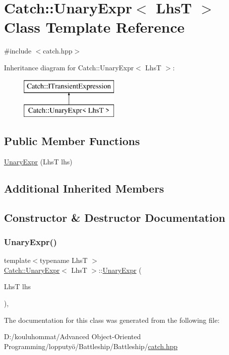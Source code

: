 \hypertarget{class_catch_1_1_unary_expr}{}\section{Catch\+:\+:Unary\+Expr$<$ LhsT $>$ Class Template Reference}
\label{class_catch_1_1_unary_expr}


{\ttfamily \#include $<$catch.\+hpp$>$}

Inheritance diagram for Catch\+:\+:Unary\+Expr$<$ LhsT $>$\+:\begin{figure}[H]
\begin{center}
\leavevmode
\includegraphics[height=2.000000cm]{class_catch_1_1_unary_expr}
\end{center}
\end{figure}
\subsection*{Public Member Functions}
\begin{DoxyCompactItemize}
\item 
\mbox{\hyperlink{class_catch_1_1_unary_expr_ae02f666a1e64da728628aa2033e1d6e7}{Unary\+Expr}} (LhsT lhs)
\end{DoxyCompactItemize}
\subsection*{Additional Inherited Members}


\subsection{Constructor \& Destructor Documentation}
\mbox{\label{class_catch_1_1_unary_expr_ae02f666a1e64da728628aa2033e1d6e7}} 
\subsubsection{\texorpdfstring{Unary\+Expr()}{UnaryExpr()}}
{\footnotesize\ttfamily template$<$typename LhsT $>$ \\
\mbox{\hyperlink{class_catch_1_1_unary_expr}{Catch\+::\+Unary\+Expr}}$<$ LhsT $>$\+::\mbox{\hyperlink{class_catch_1_1_unary_expr}{Unary\+Expr}} (\begin{DoxyParamCaption}\item[{LhsT}]{lhs }\end{DoxyParamCaption})\hspace{0.3cm}{\ttfamily [inline]}, {\ttfamily [explicit]}}



The documentation for this class was generated from the following file\+:\begin{DoxyCompactItemize}
\item 
D\+:/kouluhommat/\+Advanced Object-\/\+Oriented Programming/lopputyö/\+Battleship/\+Battleship/\mbox{\hyperlink{catch_8hpp}{catch.\+hpp}}\end{DoxyCompactItemize}
